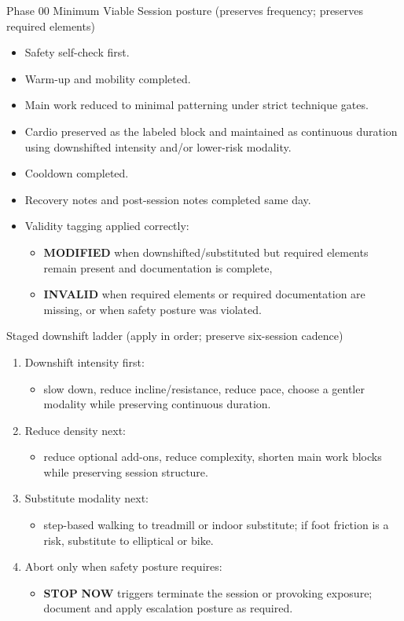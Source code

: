 \documentclass[10pt]{article}
\begin{document}
Phase 00 Minimum Viable Session posture (preserves frequency; preserves required elements)

\begin{itemize}
\item Safety self-check first.
\item Warm-up and mobility completed.
\item Main work reduced to minimal patterning under strict technique gates.
\item Cardio preserved as the labeled block and maintained as continuous duration using downshifted intensity and/or lower-risk modality.
\item Cooldown completed.
\item Recovery notes and post-session notes completed same day.
\item Validity tagging applied correctly:
  \begin{itemize}
  \item \textbf{MODIFIED} when downshifted/substituted but required elements remain present and documentation is complete,
  \item \textbf{INVALID} when required elements or required documentation are missing, or when safety posture was violated.
  \end{itemize}
\end{itemize}

Staged downshift ladder (apply in order; preserve six-session cadence)

\begin{enumerate}
\item Downshift intensity first:
  \begin{itemize}
  \item slow down, reduce incline/resistance, reduce pace, choose a gentler modality while preserving continuous duration.
  \end{itemize}

\item Reduce density next:
  \begin{itemize}
  \item reduce optional add-ons, reduce complexity, shorten main work blocks while preserving session structure.
  \end{itemize}

\item Substitute modality next:
  \begin{itemize}
  \item step-based walking to treadmill or indoor substitute; if foot friction is a risk, substitute to elliptical or bike.
  \end{itemize}

\item Abort only when safety posture requires:
  \begin{itemize}
  \item \textbf{STOP} \textbf{NOW} triggers terminate the session or provoking exposure; document and apply escalation posture as required.
  \end{itemize}
\end{enumerate}
\end{document}
